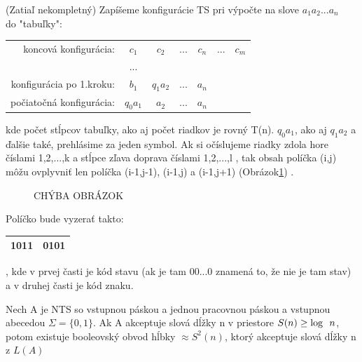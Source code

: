 \begin{dokaz}(Zatiaľ nekompletný) Zapíšeme konfigurácie TS pri výpočte na slove
  $a_1a_2...a_n$\\ do "tabuľky":
  \begin{center}
  \begin{tabular}{rcccccc}

     koncová konfigurácia:& $c_1$    &  $c_2$   & $...$ & $c_n$  & $...$ & $c_m$ \\

                          & $...$    &          &       &     \\

  konfigurácia po 1.kroku:& $b_1$    & $q_1a_2$ & $...$ & $a_n$     \\

  počiatočná konfigurácia:& $q_0a_1$ & $a_2$    & $...$ & $a_n$     \\

  \end{tabular}
  \end{center}
  kde počet stĺpcov tabuľky, ako aj počet riadkov je rovný T(n). $q_0a_1$, ako aj $q_1a_2$
  a ďalšie také, prehlásime za jeden symbol. Ak si očíslujeme riadky zdola hore číslami
  1,2,...,k a stĺpce zľava doprava číslami 1,2,...,l , tak obsah políčka (i,j) môžu
  ovplyvniť len políčka (i-1,j-1), (i-1,j) a (i-1,j+1) (Obrázok\ref{BObr4}) .
  \begin{figure}[!ht]
    \centering
    \caption{CHÝBA OBRÁZOK} \label{BObr4}
  \end{figure}

  Políčko bude vyzerať takto:
    \begin{tabular}{|c|c|}
      \hline 1011 & 0101 \\
      \hline
    \end{tabular},
  kde v prvej časti je kód stavu (ak je tam 00...0 znamená to, že nie je tam
  stav) a v druhej časti je kód znaku.
\end{dokaz}

\begin{veta}
  Nech A je NTS so vstupnou páskou a jednou pracovnou páskou a vstupnou abecedou
  $\Sigma=\{0,1\}$. Ak A akceptuje slová dĺžky n v priestore $S(n)\geq \log\enspace n$, potom
  existuje booleovský obvod hĺbky $\approx S^2(n)$, ktorý akceptuje slová dĺžky n z $L(A)$
\end{veta}

